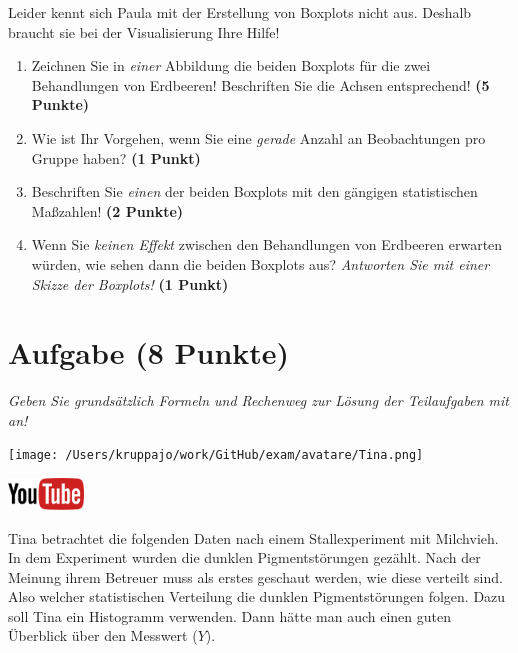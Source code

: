 \documentclass[a4paper, 9pt]{scrartcl}\usepackage[]{graphicx}\usepackage[]{xcolor}
\begin{document}
Leider kennt sich Paula mit der Erstellung von Boxplots nicht aus. Deshalb braucht sie bei der Visualisierung Ihre Hilfe!

\begin{enumerate}
\item Zeichnen Sie in \textit{einer} Abbildung die beiden Boxplots für die zwei Behandlungen von Erdbeeren! Beschriften Sie die Achsen entsprechend! \textbf{(5 Punkte)} 
\item Wie ist Ihr Vorgehen, wenn Sie eine \textit{gerade} Anzahl an
  Beobachtungen pro Gruppe haben? \textbf{(1 Punkt)}
\item Beschriften Sie \textit{einen} der beiden Boxplots mit den gängigen
  statistischen Maßzahlen! \textbf{(2 Punkte)}
\item Wenn Sie \textit{keinen Effekt} zwischen den Behandlungen von
  Erdbeeren erwarten würden, wie sehen dann die beiden Boxplots aus?
  \textit{Antworten Sie mit einer Skizze der Boxplots!}
  \textbf{(1 Punkt)}
\end{enumerate} 
\clearpage

\section{Aufgabe \hfill (8 Punkte)}

\textit{Geben Sie grundsätzlich Formeln und Rechenweg zur Lösung der Teilaufgaben mit an!} \\[1Ex]
 

 
\begin{minipage}[t]{0.5\textwidth}
\texttt{[image: /Users/kruppajo/work/GitHub/exam/avatare/Tina.png]}
\end{minipage}
\begin{minipage}[t]{0.5\textwidth}
\hfill
\href{https://youtu.be/aXvxGC4YLqk}{\includegraphics[width = 2cm]{img/youtube}}\\[1Ex]
\end{minipage}
\vspace{1ex}



Tina betrachtet die folgenden Daten nach einem Stallexperiment mit Milchvieh. In dem Experiment wurden die dunklen Pigmentstörungen gezählt. Nach der Meinung ihrem Betreuer muss als erstes geschaut werden, wie diese verteilt sind. Also welcher statistischen Verteilung die dunklen Pigmentstörungen folgen. Dazu soll Tina ein Histogramm verwenden. Dann hätte man auch einen guten Überblick über den Messwert ($Y$).
\end{document}
